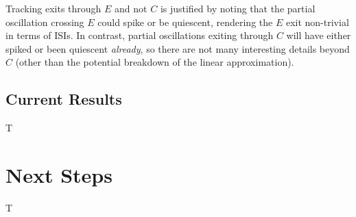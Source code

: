 \documentclass[letterpaper,12pt]{article}
\numberwithin{table}{section}
\numberwithin{figure}{section}
\numberwithin{equation}{section}
\begin{document}
\begin{flushleft}
    Tracking exits through $E$ and not $C$ is justified by noting that the partial oscillation crossing $E$ could spike or be quiescent, rendering the $E$ exit non-trivial in terms of ISIs. In contrast, partial oscillations exiting through $C$ will have either spiked or been quiescent \textit{already}, so there are not many interesting details beyond $C$ (other than the potential breakdown of the linear approximation).

    \subsection{Current Results}
    T


    \pagebreak

    \section{Next Steps}
    T

    \pagebreak

    
    

\end{flushleft}
\end{document}
